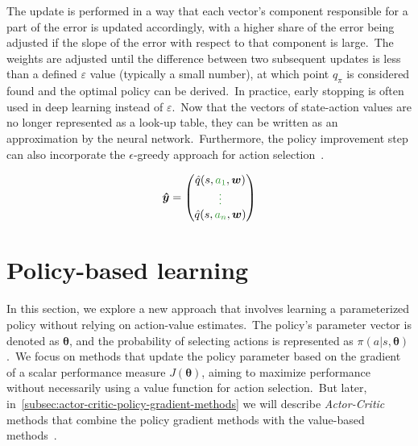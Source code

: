 \documentclass[../xlapes02]{subfiles}
\begin{document}
    The update is performed in a way that each vector's component responsible for a part of the error is updated accordingly, with a higher share of the error being adjusted if the slope of the error with respect to that component is large.\ The weights are adjusted until the difference between two subsequent updates is less than a defined $\varepsilon$ value (typically a small number), at which point $q_{\pi}$ is considered found and the optimal policy can be derived.\ In practice, early stopping is often used in deep learning instead of $\varepsilon$.\ Now that the vectors of state-action values are no longer represented as a look-up table, they can be written as an approximation by the neural network.\ Furthermore, the policy improvement step can also incorporate the $\epsilon$-greedy approach for action selection~\cite{FITMT25127, rao2022foundations, rao2022foundations}.

    \begin{equation}
        \label{eq:neural-network-approximation}
        \bm{\hat{y}} = \begin{pmatrix}
                           \hat{q}(s,\textcolor[RGB]{50,150,50}{a_1},\bm{w}) \\
                           \textcolor[RGB]{50,150,50}{\vdots}                \\
                           \hat{q}(s,\textcolor[RGB]{50,150,50}{a_n},\bm{w})
        \end{pmatrix}
    \end{equation}


    \section{Policy-based learning}\label{sec:policy-based}
    In this section, we explore a new approach that involves learning a parameterized policy without relying on action-value estimates.\ The policy's parameter vector is denoted as $\bm{\theta}$, and the probability of selecting actions is represented as $\pi(a|s, \bm{\theta})$.\ We focus on methods that update the policy parameter based on the gradient of a scalar performance measure $J(\bm{\theta})$, aiming to maximize performance without necessarily using a value function for action selection.\ But later, in~\cref{subsec:actor-critic-policy-gradient-methods} we will describe \emph{Actor-Critic} methods that combine the policy gradient methods with the value-based methods~\cite{sutton2018reinforcement}.
\end{document}
